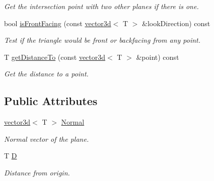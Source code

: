 \begin{DoxyCompactItemize}
\begin{DoxyCompactList}\small\item\em Get the intersection point with two other planes if there is one. \end{DoxyCompactList}\item 
bool \hyperlink{classirr_1_1core_1_1plane3d_a5b769b842600d377415d594f0db09a3e}{is\+Front\+Facing} (const \hyperlink{classirr_1_1core_1_1vector3d}{vector3d}$<$ T $>$ \&look\+Direction) const 
\begin{DoxyCompactList}\small\item\em Test if the triangle would be front or backfacing from any point. \end{DoxyCompactList}\item 
T \hyperlink{classirr_1_1core_1_1plane3d_a1877d6c25a437f2f00a664a1ac3d247f}{get\+Distance\+To} (const \hyperlink{classirr_1_1core_1_1vector3d}{vector3d}$<$ T $>$ \&point) const 
\begin{DoxyCompactList}\small\item\em Get the distance to a point. \end{DoxyCompactList}\end{DoxyCompactItemize}
\subsection*{Public Attributes}
\begin{DoxyCompactItemize}
\item 
\hyperlink{classirr_1_1core_1_1vector3d}{vector3d}$<$ T $>$ \hyperlink{classirr_1_1core_1_1plane3d_a932ca6e90e55cdceedb4f15ab706b719}{Normal}\hypertarget{classirr_1_1core_1_1plane3d_a932ca6e90e55cdceedb4f15ab706b719}{}\label{classirr_1_1core_1_1plane3d_a932ca6e90e55cdceedb4f15ab706b719}

\begin{DoxyCompactList}\small\item\em Normal vector of the plane. \end{DoxyCompactList}\item 
T \hyperlink{classirr_1_1core_1_1plane3d_afa304cf77cf1a3aae2351d5add5606a8}{D}\hypertarget{classirr_1_1core_1_1plane3d_afa304cf77cf1a3aae2351d5add5606a8}{}\label{classirr_1_1core_1_1plane3d_afa304cf77cf1a3aae2351d5add5606a8}

\begin{DoxyCompactList}\small\item\em Distance from origin. \end{DoxyCompactList}\end{DoxyCompactItemize}


